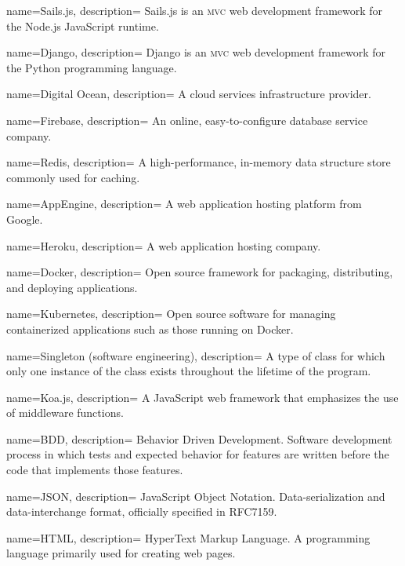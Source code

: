 \documentclass{article}
\begin{document}
{
  name=Sails.js,
  description={
    Sails.js is an \textsc{mvc} web development framework for the Node.js JavaScript runtime.
  }
}

{
  name=Django,
  description={
    Django is an \textsc{mvc} web development framework for the Python programming language.
  }
}

{
  name=Digital Ocean,
  description={
    A cloud services infrastructure provider.
  }
}

{
  name=Firebase,
  description={
    An online, easy-to-configure database service company.
  }
}

{
  name=Redis,
  description={
    A high-performance, in-memory data structure store commonly used for caching. 
  }
}

{
  name=AppEngine,
  description={
    A web application hosting platform from Google.
  }
} 

{
  name=Heroku,
  description={
    A web application hosting company.
  }
}


{
  name=Docker,
  description={
    Open source framework for packaging, distributing, and deploying applications.
  }
}

{
  name=Kubernetes,
  description={
    Open source software for managing containerized applications such as those running on Docker.
  }
}

{
  name=Singleton (software engineering),
  description={
    A type of class for which only one instance of the class exists throughout the lifetime of the program.
 } 
}

{
  name=Koa.js,
  description={
    A JavaScript web framework that emphasizes the use of middleware functions.
 } 
}

{
  name=BDD,
  description={
    Behavior Driven Development. Software development process in which tests and expected behavior for features are written before the code that implements those features.
 } 
}

{
	name=JSON,
    description={
    	JavaScript Object Notation. Data-serialization and data-interchange format, officially specified in RFC7159.
    }
}

{
	name=HTML,
    description={
    	HyperText Markup Language. A programming language primarily used for creating web pages.
    }
}

\glsaddall
\printglossaries
\end{document}

